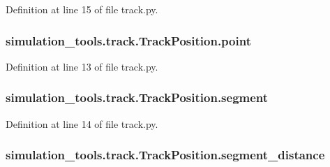 Definition at line 15 of file track.\+py.

\subsubsection[{\texorpdfstring{point}{point}}]{\setlength{\rightskip}{0pt plus 5cm}simulation\+\_\+tools.\+track.\+Track\+Position.\+point}\hypertarget{classsimulation__tools_1_1track_1_1_track_position_a5c5ad2aecf6e00e6611e8ad70b38de7b}{}\label{classsimulation__tools_1_1track_1_1_track_position_a5c5ad2aecf6e00e6611e8ad70b38de7b}


Definition at line 13 of file track.\+py.

\subsubsection[{\texorpdfstring{segment}{segment}}]{\setlength{\rightskip}{0pt plus 5cm}simulation\+\_\+tools.\+track.\+Track\+Position.\+segment}\hypertarget{classsimulation__tools_1_1track_1_1_track_position_ab5feb6f2789576c88fe7310f28e4c4db}{}\label{classsimulation__tools_1_1track_1_1_track_position_ab5feb6f2789576c88fe7310f28e4c4db}


Definition at line 14 of file track.\+py.

\subsubsection[{\texorpdfstring{segment\+\_\+distance}{segment_distance}}]{\setlength{\rightskip}{0pt plus 5cm}simulation\+\_\+tools.\+track.\+Track\+Position.\+segment\+\_\+distance}\hypertarget{classsimulation__tools_1_1track_1_1_track_position_a89c184a72d3b1636bf9531de144374e4}{}\label{classsimulation__tools_1_1track_1_1_track_position_a89c184a72d3b1636bf9531de144374e4}


